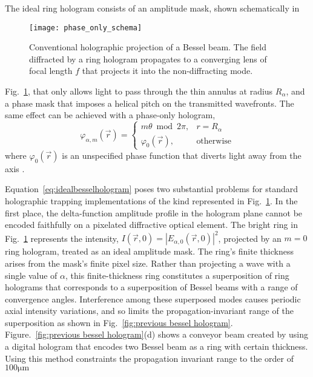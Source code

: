 The ideal ring hologram consists of an amplitude mask, shown
schematically in
\begin{figure}[t!]
  \centering
  \texttt{[image: phase\_only\_schema]}
  \caption{Conventional
    holographic projection of a Bessel beam.  The field diffracted
    by a ring hologram propagates to a converging lens of
    focal length $f$ that projects it into the non-diffracting mode.}
  \label{fig:phase_only_schema}
\end{figure}
Fig.~\ref{fig:phase_only_schema},
that only allows light to pass through the thin annulus at radius
$R_\alpha$, and a phase mask that imposes a helical pitch on the
transmitted wavefronts.
The same effect can be achieved with a
phase-only hologram,
\begin{equation}
  \label{eq:idealbesselhologram}
  \varphi_{\alpha,m}(\vec{r})
  =
  \begin{cases}
    m \theta \bmod 2 \pi, & r = R_\alpha \\
    \varphi_0(\vec{r}), & \text{otherwise}
  \end{cases}
\end{equation}
where $\varphi_0(\vec{r})$ is an unspecified
phase function that diverts light away from the
axis \cite{roichman06}.

Equation~\eqref{eq:idealbesselhologram}
poses two substantial problems for standard
holographic trapping implementations
of the kind represented in Fig.~\ref{fig:phase_only_schema}.
In the first place, the delta-function
amplitude profile in the hologram plane cannot be encoded
faithfully on a pixelated diffractive optical element.
The bright ring in Fig.~\ref{fig:phase_only_schema} represents
the intensity,
$I(\vec{r},0) = \left\vert  E_{\alpha,0}(\vec{r},0)\right\vert^2$,
projected by an $m = 0$ ring hologram, treated as an
ideal amplitude mask.
The ring's finite thickness arises from the mask's
finite pixel size.
Rather than projecting a wave with a single value of $\alpha$,
this finite-thickness ring constitutes a superposition of
ring holograms that corresponds to a
superposition of Bessel beams with
a range of convergence angles.
Interference among these superposed modes
causes periodic axial intensity variations,
and so limits the propagation-invariant
range of the superposition \cite{ruffner12a} as shown in Fig.~\ref{fig:previous bessel hologram}. Figure.~\ref{fig:previous bessel hologram}(d) shows a conveyor beam created by using a digital hologram that encodes two Bessel beam as a ring with certain thickness. Using this method constraints the propagation invariant range to the order of $100\mathrm{\mu m}$

